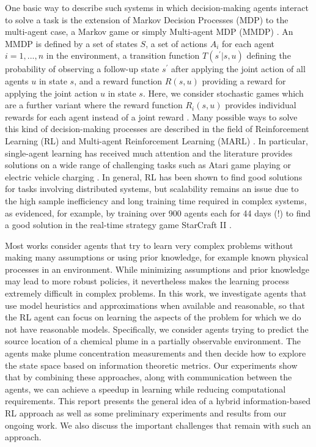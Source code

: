 \documentclass[letterpaper]{article} %
\begin{document}
One basic way to describe such systems in which decision-making agents interact to solve a task is the extension of Markov Decision Processes (MDP) \cite{puterman2014markov} to the multi-agent case, a Markov game or simply Multi-agent MDP (MMDP) \cite{littman1994markov}.
An MMDP is defined by a set of states $S$, a set of actions $A_{i}$ for each agent $i={1,...,n}$ in the environment, a transition function $T(s^{'}|s,u)$ defining the probability of observing a follow-up state $s^{'}$ after applying the joint action of all agents $u$ in state $s$, and a reward function $R(s,u)$ providing a reward for applying the joint action $u$ in state $s$.
Here, we consider stochastic games which are a further variant where the reward function $R_{i}(s,u)$ provides individual rewards for each agent instead of a joint reward \cite{bowling2000analysis}.
Many possible ways to solve this kind of decision-making processes are described in the field of Reinforcement Learning (RL) \cite{sutton2018reinforcement} and Multi-agent Reinforcement Learning (MARL) \cite{busoniu2008comprehensive}.
In particular, single-agent learning has received much attention and the literature provides solutions on a wide range of challenging tasks such as Atari game playing \cite{mnih2015human} or electric vehicle charging \cite{pettit2019increasing}.
In general, RL has been shown to find good solutions for tasks involving distributed systems, but scalability remains an issue due to the high sample inefficiency and long training time required in complex systems, as evidenced, for example, by training over 900 agents each for 44 days (!) to find a good solution in the real-time strategy game StarCraft II \cite{vinyals2019grandmaster}.

Most works consider agents that try to learn very complex problems without making many assumptions or using prior knowledge, for example known physical processes in an environment. While minimizing assumptions and prior knowledge may lead to more robust policies, it nevertheless makes the learning process extremely difficult in complex problems.
In this work, we investigate agents that use model heuristics and approximations when available and reasonable, so that the RL agent can focus on learning the aspects of the problem for which we do not have reasonable models.
Specifically, we consider agents trying to predict the source location of a chemical plume in a partially observable environment. The agents make plume concentration measurements and then decide how to explore the state space based on information theoretic metrics.
Our experiments show that by combining these approaches, along with communication between the agents, we can achieve a speedup in learning while reducing computational requirements.
This report presents the general idea of a hybrid information-based RL approach as well as some preliminary experiments and results from our ongoing work.
We also discuss the important challenges that remain with such an approach.
\end{document}
